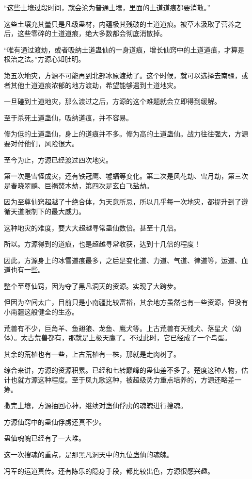 \begin{this_body}
“这些土壤过段时间，就会沦为普通土壤，里面的土道道痕都要消散。”

这些土壤充其量只是凡级蛊材，内蕴极其残破的土道道痕。被草木汲取了营养之后，这些零碎的土道道痕，绝大多数都会彻底消散掉。

“唯有通过渡劫，或者吸纳土道蛊仙的一身道痕，增长仙窍中的土道道痕，才算是根治之法。”方源心知肚明。

第五次地灾，方源不可能再到北部冰原渡劫了。这个时候，就可以选择去南疆，或者其他土道道痕浓郁的地方渡劫，希望能够遇到土道地灾。

一旦碰到土道地灾，那么渡过之后，方源的这个难题就会立即得到缓解。

至于杀死土道蛊仙，吸纳道痕，并不容易。

修为低的土道蛊仙，身上的道痕并不多。修为高的土道蛊仙。战力往往强大，方源要对付他们，风险很大。

至今为止，方源已经渡过四次地灾。

第一次是雪怪成灾，还有铁冠鹰、墟蝠等变化。第二次是风花劫、雪月劫，第三次是春晓翠鹂、巨祸焚木劫，第四次是玄白飞盐劫。

因为至尊仙窍超越了十绝合体，为天意所忌，所以几乎每一次地灾，都提升到了遵循天道限制下的最大威力。

这种地灾的难度，要大大超越寻常蛊仙数倍。甚至十几倍。

所以。方源得到的道痕，也是超越寻常收获，达到十几倍的程度！

因此，方源身上的冰雪道痕最多，之后是变化道、力道、气道、律道等，运道、血道也有一些。

整个至尊仙窍，因为夺了黑凡洞天的资源。实现了大跨步。

但因为空间太广，目前只是小南疆比较富裕，其余地方虽然也有一些资源，但没有小南疆这般健全的生态。

荒兽有不少，巨角羊、鱼翅狼、龙鱼、鹰犬等。上古荒兽有天残犬、落星犬（幼体）。太古荒兽都有，那就是上极天鹰了。不过此时，它已经成了一个鸟蛋。

其余的荒植也有一些，上古荒植有一株，那就是走肉树了。

综合来讲，方源的资源积累。已经和七转巅峰的蛊仙差不多了。楚度这种人物，估计也就方源这种程度。至于凤九歌这种，被超级势力重点培养的，方源还略差一筹。

撒完土壤，方源抽回心神，继续对蛊仙俘虏的魂魄进行搜魂。

方源仙窍中的蛊仙俘虏还真不少。

蛊仙魂魄已经有了一大堆。

这一次搜魂的重点，是那黑凡洞天中的九位蛊仙的魂魄。

冯军的运道真传。还有陈乐的隐身手段，都比较出色，方源很感兴趣。


\end{this_body}

